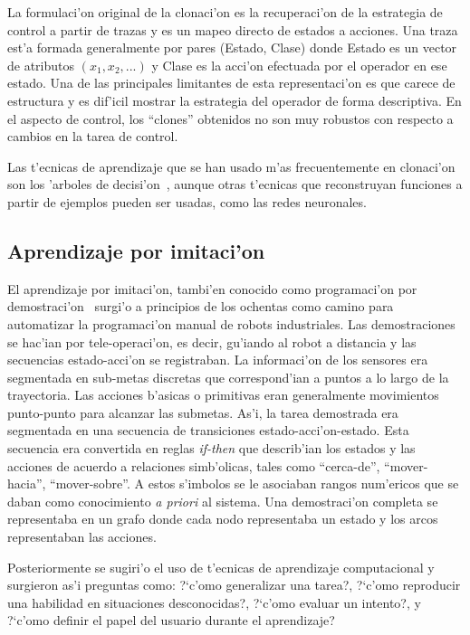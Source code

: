 \documentclass[11pt]{article}
\begin{document}
La formulaci'on original de la \textsf{clonaci'on} es la recuperaci'on de la estrategia de control a partir de trazas y es un mapeo directo de estados a acciones. Una traza est'a formada generalmente por pares (Estado, Clase) donde Estado es un vector de atributos $(x_1,x_2,...)$ y Clase es la acci'on efectuada por el operador en ese estado. Una de las principales limitantes de esta representaci'on es que carece de estructura y es dif'icil mostrar la estrategia del operador de forma descriptiva. En el aspecto de control, los ``clones'' obtenidos no son muy robustos con respecto a cambios en la tarea de control.

Las t'ecnicas de aprendizaje que se han usado m'as frecuentemente en \textsf{clonaci'on} son los \textsf{'arboles de decisi'on}~\cite{quinlan1986}, aunque otras t'ecnicas que reconstruyan funciones a partir de ejemplos pueden ser usadas, como las redes neuronales.
 

\subsection{Aprendizaje por imitaci'on}
 El \textsf{aprendizaje por imitaci'on}, tambi'en conocido como \textsf{programaci'on por demostraci'on}~\cite{aude:pbd} surgi'o a principios de los ochentas como camino para automatizar la programaci'on manual de robots industriales. Las demostraciones se hac'ian por tele-operaci'on, es decir, gu'iando al robot a distancia y las secuencias estado-acci'on se registraban. La informaci'on de los sensores era segmentada en sub-metas discretas que correspond'ian a puntos a lo largo de la trayectoria. Las acciones b'asicas o primitivas eran generalmente movimientos punto-punto para alcanzar las submetas. As'i, la tarea demostrada era segmentada en una secuencia de transiciones estado-acci'on-estado. Esta secuencia era convertida en reglas \textit{if-then} que describ'ian los estados y las acciones de acuerdo a relaciones simb'olicas, tales como ``cerca-de'', ``mover-hacia'', ``mover-sobre''. A estos s'imbolos se le asociaban rangos num'ericos que se daban como conocimiento \textit{a priori} al sistema.  Una demostraci'on completa se representaba en un grafo donde cada nodo representaba un estado y los arcos representaban las acciones. 

Posteriormente se sugiri'o el uso de t'ecnicas de aprendizaje computacional y surgieron as'i preguntas como: ?`c'omo generalizar una tarea?, ?`c'omo reproducir una habilidad en situaciones desconocidas?, ?`c'omo evaluar un intento?, y ?`c'omo definir el papel del usuario durante el aprendizaje?
\end{document}
